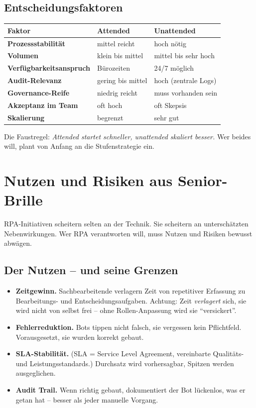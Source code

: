 \documentclass[11pt,a4paper,oneside]{article}
\begin{document}
\subsection{Entscheidungsfaktoren}

\begin{tabularx}{\linewidth}{@{}>{\bfseries}lXX@{}}
\toprule
Faktor & Attended & Unattended \\
\midrule
Prozessstabilität & mittel reicht & hoch nötig \\
Volumen & klein bis mittel & mittel bis sehr hoch \\
Verfügbarkeitsanspruch & Bürozeiten & 24/7 möglich \\
Audit-Relevanz & gering bis mittel & hoch (zentrale Logs) \\
Governance-Reife & niedrig reicht & muss vorhanden sein \\
Akzeptanz im Team & oft hoch & oft Skepsis \\
Skalierung & begrenzt & sehr gut \\
\bottomrule
\end{tabularx}

\medskip

\noindent Die Faustregel: \emph{Attended startet schneller, unattended skaliert besser.} Wer beides will, plant von Anfang an die Stufenstrategie ein.

\section{Nutzen und Risiken aus Senior-Brille}

RPA-Initiativen scheitern selten an der Technik. Sie scheitern an unterschätzten Nebenwirkungen. Wer RPA verantworten will, muss Nutzen und Risiken bewusst abwägen.

\subsection{Der Nutzen -- und seine Grenzen}

\begin{itemize}
  \item \textbf{Zeitgewinn.} Sachbearbeitende verlagern Zeit von repetitiver Erfassung zu Bearbeitungs- und Entscheidungsaufgaben. Achtung: Zeit \emph{verlagert} sich, sie wird nicht von selbst frei -- ohne Rollen-Anpassung wird sie ``versickert''.
  \item \textbf{Fehlerreduktion.} Bots tippen nicht falsch, sie vergessen kein Pflichtfeld. Vorausgesetzt, sie wurden korrekt gebaut.
  \item \textbf{SLA-Stabilität.} (SLA = Service Level Agreement, vereinbarte Qualit\"ats- und Leistungsstandards.) Durchsatz wird vorhersagbar, Spitzen werden ausgeglichen.
  \item \textbf{Audit Trail.} Wenn richtig gebaut, dokumentiert der Bot lückenlos, was er getan hat -- besser als jeder manuelle Vorgang.
\end{itemize}
\end{document}
